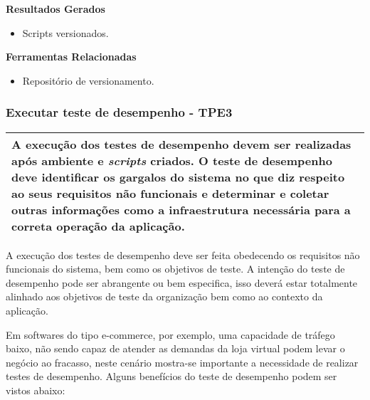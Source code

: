 \textbf{Resultados Gerados}
\begin{itemize}
    \item Scripts versionados.
\end{itemize}

\textbf{Ferramentas Relacionadas}
\begin{itemize}
    \item Repositório de versionamento.
\end{itemize}

\subsubsection{Executar teste de desempenho - TPE3}
\label{sec:tpe1}

\begin{table}[H]
\centering
\begin{tabular}{|p{130mm}|}
\hline
A execução dos testes de desempenho devem ser realizadas após ambiente e \textit{scripts} criados. O teste de desempenho deve identificar os gargalos do sistema no que diz respeito ao seus requisitos não funcionais e determinar e coletar outras informações como a infraestrutura necessária para a correta operação da aplicação.\\ 
\hline
\end{tabular}
\end{table}

A execução dos testes de desempenho deve ser feita obedecendo os requisitos não funcionais do sistema, bem como os objetivos de teste. A intenção do teste de desempenho pode ser abrangente ou bem especifica, isso deverá estar totalmente alinhado aos objetivos de teste da organização bem como ao contexto da aplicação.

Em softwares do tipo e-commerce, por exemplo, uma capacidade de tráfego baixo, não sendo capaz de atender as demandas da loja virtual podem levar o negócio ao fracasso, neste cenário mostra-se importante a necessidade de realizar testes de desempenho. Alguns benefícios do teste de desempenho podem ser vistos abaixo:

